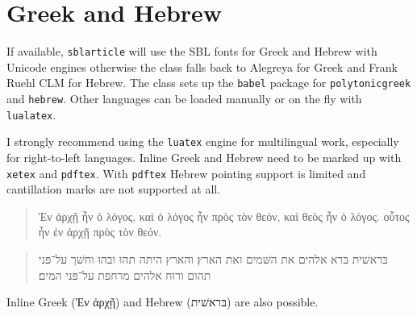 \documentclass{sblarticle}
\begin{document}
\section{Greek and Hebrew}

If available, \texttt{sblarticle} will use the SBL fonts for Greek and Hebrew
with Unicode engines otherwise the class falls back to Alegreya for Greek and
Frank Ruehl CLM for Hebrew. The class sets up the \texttt{babel} package for
\texttt{polytonicgreek} and \texttt{hebrew}. Other languages can be loaded
manually or on the fly with \texttt{lualatex}.

I strongly recommend using the \texttt{luatex} engine for multilingual work,
especially for right-to-left languages. Inline Greek and Hebrew need to be
marked up with \texttt{xetex} and \texttt{pdftex}. With \texttt{pdftex} Hebrew
pointing support is limited and cantillation marks are not supported at all.
\begin{quotation}
  Ἐν ἀρχῇ ἦν ὁ λόγος, καὶ ὁ λόγος ἦν πρὸς τὸν θεόν, καὶ θεὸς ἦν ὁ λόγος.
  οὗτος ἦν ἐν ἀρχῇ πρὸς τὸν θεόν.
\end{quotation}
\begin{quotation}
  בּראשׁית בּרא אלהים את השּׁמים ואת הארץ׃ והארץ היתה תהוּ ובהוּ וחשׁך על־פּני תהום
  ורוּח אלהים מרחפת על־פּני המּים׃
\end{quotation}
Inline Greek (\foreignlanguage{polytonicgreek}{Ἐν ἀρχῇ}) and Hebrew
(\foreignlanguage{hebrew}{בּראשׁית}) are also possible.

\nocite{NIDNTT, Jastrow, DMBI, mclay:2006, oday:intertextuality, vonrad:1990}

\printbibliography[heading=bibintoc]
\end{document}
